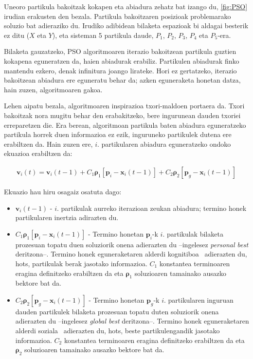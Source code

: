 \documentclass[eu]{ifirak}\usepackage[]{graphicx}\usepackage[]{color}
\newcommand{\zkk}{\guillemotleft}
\newcommand{\skk}{\guillemotright}
\newcommand{\eng}[1]{\textit{#1}}
\newcommand{\hgl}[1]{\zkk #1\skk\ }
\begin{document}
Uneoro partikula bakoitzak kokapen eta abiadura zehatz bat izango du, \ref{fig:PSO} irudian erakusten den bezala. Partikula bakoitzaren posizioak problemarako soluzio bat adieraziko du. Irudiko adibidean bilaketa espazioak bi aldagai besterik ez ditu ($X$ eta $Y$), eta sisteman 5 partikula daude, $P_1$, $P_2$, $P_3$, $P_4$ eta $P_5$-era.

Bilaketa gauzatzeko, PSO algoritmoaren iterazio bakoitzean partikula guztien kokapena eguneratzen da, haien abiadurak erabiliz. Partikulen abiadurak finko mantendu ezkero, denak infinitura joango lirateke. Hori ez gertatzeko, iterazio bakoitzean abiadura ere eguneratu behar da; azken eguneraketa honetan datza, hain zuzen, algoritmoaren gakoa. 

Lehen aipatu bezala, algoritmoaren inspirazioa txori-maldoen portaera da. Txori bakoitzak nora mugitu behar den erabakitzeko, bere ingurunean dauden txoriei erreparetzen die. Era berean, algoritmoan partikula baten abiadura eguneratzeko partikula horrek duen informazioa ez ezik, inguruneko partikulek dutena ere erabiltzen da. Hain zuzen ere, $i$. partikularen abiadura eguneratzeko ondoko ekuazioa erabiltzen da:

\begin{align*}
\mathbf{v}_i(t) = \mathbf{v}_i(t-1) +  C_1 \mathbf{\rho}_1 [\mathbf{p}_i - \mathbf{x}_i(t-1)] + C_2 \mathbf{\rho}_2 [\mathbf{p}_g - \mathbf{x}_i(t-1)]
\end{align*}

Ekuazio hau hiru osagaiz osatuta dago:

\begin{itemize}
\item $\mathbf{v}_i(t-1)$ - $i$. partikulak aurreko iterazioan zeukan abiadura; termino honek partikularen inertzia adirazten du.
\item $C_1 {\mathbf \rho_1} [\mathbf{p}_i - \mathbf{x}_i(t-1)]$ - Termino honetan $\mathbf{p}_i$-k $i$. partikulak bilaketa prozesuan topatu duen soluziorik onena adierazten du --ingelesez \eng{personal best} deritzona--. Termino honek eguneraketaren alderdi \hgl{kognitiboa} adierazten du, hots, partikulak berak jasotako informazioa. $C_1$ konstantea terminoaren eragina definitzeko erabiltzen da eta $\mathbf{\rho}_1$ soluzioaren tamainako ausazko bektore bat da.
\item $C_2 \mathbf{\rho}_2 [\mathbf{p}_g - \mathbf{x}_i(t-1)]$ - Termino honetan $\mathbf{p}_g$-k $i$. partikularen inguruan dauden partikulek bilaketa prozesuan topatu duten soluziorik onena adierazten du --ingelesez \eng{global best} deritzona--. Termino honek eguneraketaren alderdi \hgl{soziala} adierazten du, hots, beste partikulengandik jasotako informazioa. $C_2$ konstantea terminoaren eragina definitzeko erabiltzen da eta $\mathbf{\rho}_2$ soluzioaren tamainako ausazko bektore bat da.
\end{itemize}
\end{document}
